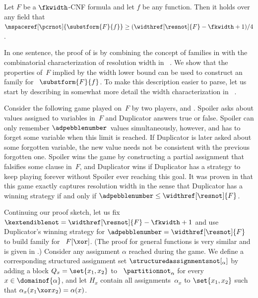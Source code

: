 \documentclass{toc}
\begin{document}
\begin{theorem}
  \label{thm:substitution}
  Let $F$ be a $\fkwidth$-CNF formula
  and let $f$ be any
  \nonauthor{} function. 
  Then it  holds over any field that
  $\mspaceref[\pcrnot]{\substform{F}{f}}
  \geq
  (\widthref[\resnot]{F} -  \fkwidth  + 1) /  4$.

\end{theorem}

\begin{ourproof}[sketch]
  In one sentence, the proof of
  is by combining the concept of
  \kextendibleNok families in
  with the combinatorial  characterization of resolution width in~%
  \cite{AD08CombinatoricalCharacterization}.
  We show that the  properties of~$F$ implied by the
  width lower bound  can be used to construct an \kextendibleNok family for~%
  $\substform{F}{f}$.
  To make this description easier to parse,
  let us start by describing in somewhat more detail the width
  characterization in~%
  \cite{AD08CombinatoricalCharacterization}.
  
  Consider the following game played on~$F$
  by two players, %
   and . 
  Spoiler asks about values assigned to variables in~$F$ and
  Duplicator answers true or false. Spoiler can only remember 
  $\adpebblenumber$~values
  simultaneously, however, and has to forget some variable when this limit is 
  reached.
  If Duplicator is later asked about some forgotten variable,
  the new value needs not be consistent with the previous
  forgotten one. Spoiler wins the game by constructing a partial
  assignment that falsifies some clause in~$F$, and
  Duplicator wins 
  if %
  Duplicator has  %
  a strategy to keep playing forever without
  Spoiler ever reaching this goal. It was proven in
  \cite{AD08CombinatoricalCharacterization}
  that this game exactly captures resolution
  width in the sense that Duplicator has a winning strategy if and only if
  $\adpebblenumber \leq \widthref[\resnot]{F}$.

  Continuing our proof sketch, let us fix
  $\kextendiblenot=\widthref[\resnot]{F} - \fkwidth + 1$
  and  use Duplicator's winning strategy for
  $\adpebblenumber = \widthref[\resnot]{F}$
  to build \akextendible family for~%
  $F[\xor]$.  (The proof  %
  for general \nonauthor{} functions is very similar and is given in
   .)   %
  Consider any assignment $\alpha$ reached during the
  game. We define a corresponding structured assignment set
  $\structuredassignmentsnot[_\alpha]$
  by adding a block
  $Q_{x}=\set{x_{1},x_{2}}$
  to~%
%
  $\partitionnot_\alpha$
  for every $x \in \domainof{\alpha}$,
  and let $H_{x}$ 
  contain all assignments~$\alpha_x$ to
  $\set{x_{1},x_{2}}$
  such that
  $\alpha_x (x_1 \xor x_2)  =  \alpha(x)$.


\end{ourproof}
\end{document}
